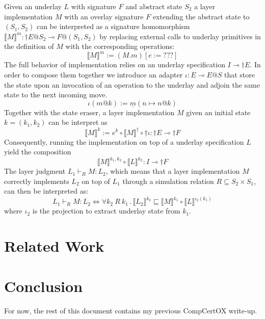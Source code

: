 \documentclass[sigplan,10pt,review,anonymous]{acmart}
\begin{document}
Given an underlay $L$ with signature $F$ and abstract state $S_2$
a layer implementation $M$
with an overlay signature $F$
extending the abstract state to $(S_1, S_2)$
can be interpreted as
a signature homomorphism $\llbracket M \rrbracket^m :  \dagger E@S_2 \multimap F@(S_1, S_2)$
by replacing external calls to underlay primitives
in the definition of $M$ with the corresponding operations:
\[
  \llbracket M \rrbracket^m \mathrel{:=} (M.m)[e \mathrel{:=} ???]
\]
The full behavior of implementation relies on
an underlay specification $I \multimap \dagger E$.
In order to compose them together
we introduce an adapter $\iota: E \multimap E@S$
that store the state upon an invocation of an operation to the underlay
and adjoin the same state to the next
incoming move.
\[
  \iota(m@k) \mathrel{:=} \underline{m}(n \mapsto n@k)
\]
Together with the state eraser,
a layer implementation $M$
given an initial state $k=(k_1,k_2)$
can be interpret as
\[
  \llbracket M \rrbracket^k \mathrel{:=}
  e^k \circ \llbracket M \rrbracket^\dagger \circ \dagger \iota : \dagger E \multimap \dagger F
\]
Consequently, running the implementation on top of
a underlay specification $L$ yield the composition
\[
  \llbracket M \rrbracket^{k_1,k_2} \circ \llbracket L \rrbracket^{k_2} : I \multimap \dagger F
\]
The layer judgment $L_1 \vdash_R M : L_2$,
which means that a layer implementation $M$
correctly implements $L_2$ on top of  $L_1$ through
a simulation relation $R \subseteq S_2 \times S_1$,
can then be interpreted as:
\[
  L_1 \vdash_R M : L_2 \Leftrightarrow
  \forall k_2\ R\ k_1\,.\, 
\llbracket L_2 \rrbracket^{k_2} \sqsubseteq
\llbracket M \rrbracket^{k_1} \circ \llbracket L \rrbracket^{\iota_2(k_1)}
\]
where $\iota_2$ is the projection to extract underlay state from $k_1$.

\section{Related Work}

\section{Conclusion}

\newpage

\noindent
For now,
the rest of this document contains my previous CompCertOX write-up.
\end{document}
